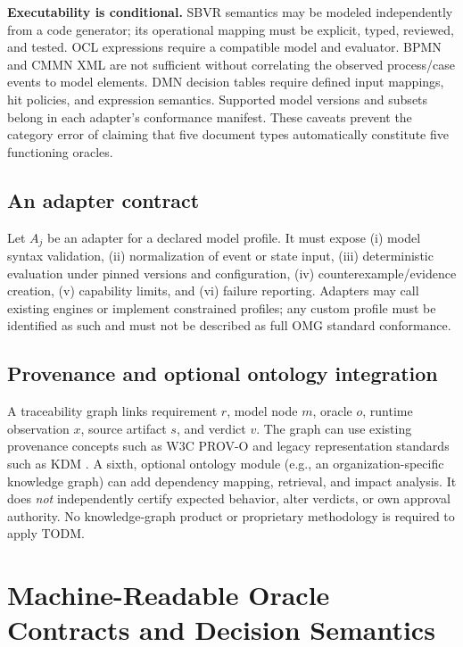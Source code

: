 \documentclass[11pt,a4paper]{article}
\newcommand{\todm}{\textsc{TODM}}
\begin{document}
\textbf{Executability is conditional.} SBVR semantics may be modeled independently from a code generator; its operational mapping must be explicit, typed, reviewed, and tested. OCL expressions require a compatible model and evaluator. BPMN and CMMN XML are not sufficient without correlating the observed process/case events to model elements. DMN decision tables require defined input mappings, hit policies, and expression semantics. Supported model versions and subsets belong in each adapter's conformance manifest. These caveats prevent the category error of claiming that five document types automatically constitute five functioning oracles.

\subsection{An adapter contract}
Let $A_j$ be an adapter for a declared model profile. It must expose (i) model syntax validation, (ii) normalization of event or state input, (iii) deterministic evaluation under pinned versions and configuration, (iv) counterexample/evidence creation, (v) capability limits, and (vi) failure reporting. Adapters may call existing engines or implement constrained profiles; any custom profile must be identified as such and must not be described as full OMG standard conformance.

\subsection{Provenance and optional ontology integration}
A traceability graph links requirement $r$, model node $m$, oracle $o$, runtime observation $x$, source artifact $s$, and verdict $v$. The graph can use existing provenance concepts such as W3C PROV-O \cite{w3c2013prov} and legacy representation standards such as KDM \cite{omg2020kdm}. A sixth, optional ontology module (e.g., an organization-specific knowledge graph) can add dependency mapping, retrieval, and impact analysis. It does \emph{not} independently certify expected behavior, alter verdicts, or own approval authority. No knowledge-graph product or proprietary methodology is required to apply \todm{}.

\section{Machine-Readable Oracle Contracts and Decision Semantics}
\end{document}
